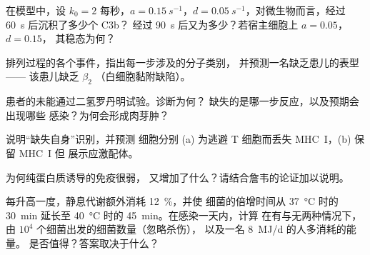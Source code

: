\begin{exercise}[$\star\star$]\label{exo:b3:innate-immunity:5}
在模型中，设 $k_{0} = 2$ 每秒，$a =
\qty{0.15}{s^{-1}}$，$d = \qty{0.05}{s^{-1}}$，对微生物而言，经过 \qty{60}{s} 后沉积了多少个 C3b？
经过 \qty{90}{s} 后又为多少？若宿主细胞上 $a = 0.05$，$d = 0.15$，
其稳态为何？
\end{exercise}

\begin{exercise}[$\star\star$]\label{exo:b3:innate-immunity:6}
排列过程的各个事件，指出每一步涉及的分子类别，
并预测一名缺乏患儿的表型——
该患儿缺乏 $\beta_{2}$ （白细胞黏附缺陷）。
\end{exercise}

\begin{exercise}[$\star\star$]\label{exo:b3:innate-immunity:7}
患者的未能通过二氢罗丹明试验。诊断为何？
缺失的是哪一步反应，以及预期会出现哪些
感染？为何会形成肉芽肿？
\end{exercise}

\begin{exercise}[$\star\star$]\label{exo:b3:innate-immunity:8}
说明“缺失自身”识别，并预测
细胞分别 (a) 为逃避 T 细胞而丢失 MHC~I，(b) 保留 MHC~I 但
展示应激配体。
\end{exercise}

\begin{exercise}[$\star\star$]\label{exo:b3:innate-immunity:9}
为何纯蛋白质诱导的免疫很弱，
又增加了什么？请结合詹韦的论证加以说明。
\end{exercise}

\begin{exercise}[$\star\star\star$]\label{exo:b3:innate-immunity:10}
每升高一度，静息代谢额外消耗 \qty{12}{\%}，并使
细菌的倍增时间从 \qty{37}{\celsius} 时的 \qty{30}{min}
延长至 \qty{40}{\celsius} 时的 \qty{45}{min}。在感染一天内，计算
在有与无两种情况下，由 $10^{4}$ 个细菌出发的细菌数量（忽略杀伤），
以及一名 \qty{8}{MJ/d} 的人多消耗的能量。
是否值得？答案取决于什么？
\end{exercise}

